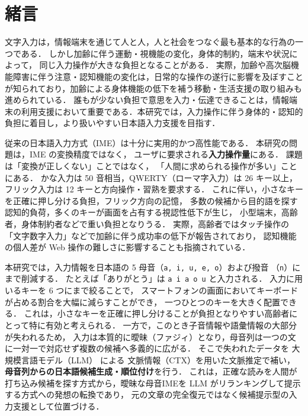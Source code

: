 \section{緒言}

文字入力は，情報端末を通じて人と人，人と社会をつなぐ最も基本的な行為の一つである．
しかし加齢に伴う運動・視機能の変化，身体的制約，端末や状況によって，
同じ入力操作が大きな負担となることがある．
実際，加齢や高次脳機能障害に伴う注意・認知機能の変化は，日常的な操作の遂行に影響を及ぼすことが知られており\cite{kubota2018cognitive}，加齢による身体機能の低下を補う移動・生活支援の取り組みも進められている\cite{nakamura2015seniorcar}． %
誰もが少ない負担で意思を入力・伝達できることは，情報端末の利用支援において重要である．本研究では，入力操作に伴う身体的・認知的負担に着目し，より扱いやすい日本語入力支援を目指す．

従来の日本語入力方式（IME）は十分に実用的かつ高性能である．
本研究の問題は，IME の変換精度ではなく，
ユーザに要求される\textbf{入力操作量}にある．
課題は「変換が正しくない」ことではなく，
「人間に求められる操作が多い」ことにある．
かな入力は 50 音相当，QWERTY（ローマ字入力）は 26 キー以上，フリック入力は 12 キーと方向操作・習熟を要求する． %
これに伴い，小さなキーを正確に押し分ける負担，フリック方向の記憶，
多数の候補から目的語を探す認知的負荷，多くのキーが画面を占有する視認性低下が生じ，
小型端末，高齢者，身体制約者などで重い負担となりうる．
実際，高齢者ではタッチ操作の「文字数字入力」などで加齢に伴う成功率の低下が報告されており\cite{hatakenaka2024touch}，
認知機能の個人差が Web 操作の難しさに影響することも指摘されている\cite{suzuki2009elderly}．

本研究では，入力情報を日本語の 5 母音（\texttt{a, i, u, e, o}）および撥音
（\texttt{n}）にまで削減する．
たとえば「ありがとう」は \texttt{a i a o u} と入力される．
入力に用いるキーを 6 つにまで絞ることで，
スマートフォンの画面においてキーボードが占める割合を大幅に減らすことができ，
一つひとつのキーを大きく配置できる．
これは，小さなキーを正確に押し分けることが負担となりやすい高齢者にとって特に有効と考えられる．
一方で，このとき子音情報や語彙情報の大部分が失われるため，
入力は本質的に曖昧（ファジィ）となり，母音列は一つの文に一対一で対応せず複数の候補へ多義的に広がる． %
そこで失われたデータを 大規模言語モデル（LLM） による 文脈情報（CTX）を用いた文脈推定で補い，
\textbf{母音列からの日本語候補生成・順位付け}を行う．
これは，正確な読みを人間が打ち込み候補を探す方式から，曖昧な母音IMEを LLM がリランキングして提示する方式への発想の転換であり，
元の文章の完全復元ではなく候補提示型の入力支援として位置づける．

